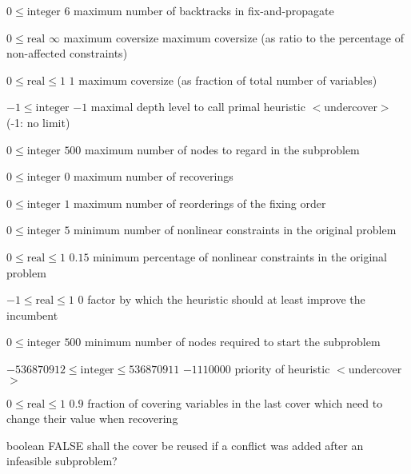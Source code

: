%
{$0\leq\textrm{integer}$}%
{$6$}%
{maximum number of backtracks in fix-and-propagate}%
{}

%
{$0\leq\textrm{real}$}%
{$\infty$}%
{maximum coversize maximum coversize (as ratio to the percentage of non-affected constraints)}%
{}

%
{$0\leq\textrm{real}\leq1$}%
{$1$}%
{maximum coversize (as fraction of total number of variables)}%
{}

%
{$-1\leq\textrm{integer}$}%
{$-1$}%
{maximal depth level to call primal heuristic $<$undercover$>$ (-1: no limit)}%
{}

%
{$0\leq\textrm{integer}$}%
{$500$}%
{maximum number of nodes to regard in the subproblem}%
{}

%
{$0\leq\textrm{integer}$}%
{$0$}%
{maximum number of recoverings}%
{}

%
{$0\leq\textrm{integer}$}%
{$1$}%
{maximum number of reorderings of the fixing order}%
{}

%
{$0\leq\textrm{integer}$}%
{$5$}%
{minimum number of nonlinear constraints in the original problem}%
{}

%
{$0\leq\textrm{real}\leq1$}%
{$0.15$}%
{minimum percentage of nonlinear constraints in the original problem}%
{}

%
{$-1\leq\textrm{real}\leq1$}%
{$0$}%
{factor by which the heuristic should at least improve the incumbent}%
{}

%
{$0\leq\textrm{integer}$}%
{$500$}%
{minimum number of nodes required to start the subproblem}%
{}

%
{$-536870912\leq\textrm{integer}\leq536870911$}%
{$-1110000$}%
{priority of heuristic $<$undercover$>$}%
{}

%
{$0\leq\textrm{real}\leq1$}%
{$0.9$}%
{fraction of covering variables in the last cover which need to change their value when recovering}%
{}

%
{boolean}%
{FALSE}%
{shall the cover be reused if a conflict was added after an infeasible subproblem?}%
{}

